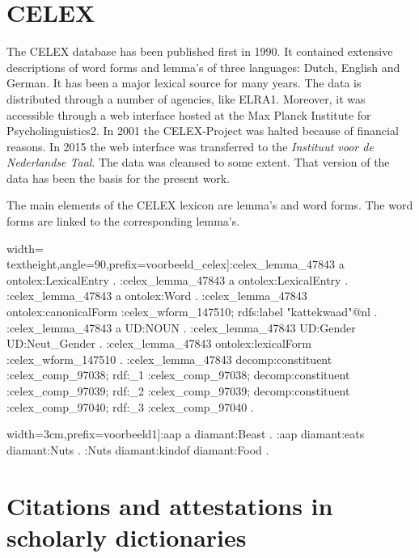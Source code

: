\documentclass[10pt]{article}
\newenvironment{rdf}[1]{\begingroup\obeylines}{\endgroup}
\begin{document}
\section{CELEX}


The CELEX database has been published first in 1990. It contained extensive descriptions of word forms and lemma’s of three languages: Dutch, English and German. It has been a major lexical source for many years. The data is distributed through a number of agencies, like ELRA1. Moreover, it was accessible through a web interface hosted at the Max Planck Institute for Psycholinguistics2. In 2001 the CELEX-Project was halted because of financial reasons. In 2015 the web interface was transferred to the \textit{Instituut voor de Nederlandse Taal}. The data was cleansed to some extent. That version of the data has been the basis for the present work.

The main elements of the CELEX lexicon are lemma’s and word forms. The word forms are linked to the corresponding lemma’s. 


\begin{rdf}[width=\\textheight,angle=90,prefix=voorbeeld_celex]:celex_lemma_47843 a ontolex:LexicalEntry .
:celex_lemma_47843 a ontolex:LexicalEntry .
:celex_lemma_47843 a ontolex:Word .
:celex_lemma_47843 ontolex:canonicalForm :celex_wform_147510; rdfs:label "kattekwaad"@nl .
:celex_lemma_47843 a UD:NOUN .
:celex_lemma_47843 UD:Gender UD:Neut_Gender .
:celex_lemma_47843 ontolex:lexicalForm :celex_wform_147510 .
:celex_lemma_47843 decomp:constituent :celex_comp_97038; rdf:_1 :celex_comp_97038; decomp:constituent :celex_comp_97039; rdf:_2 :celex_comp_97039; decomp:constituent :celex_comp_97040; rdf:_3 :celex_comp_97040 .



\caption{Celex "kattekwaad" example}
\end{rdf}

\begin{rdf}[width=3cm,prefix=voorbeeld1]:aap a diamant:Beast .
:aap diamant:eats diamant:Nuts .
:Nuts diamant:kindof diamant:Food .
\caption{Apen eten noten}
\end{rdf}


\section{Citations and attestations in scholarly dictionaries}
\end{document}
